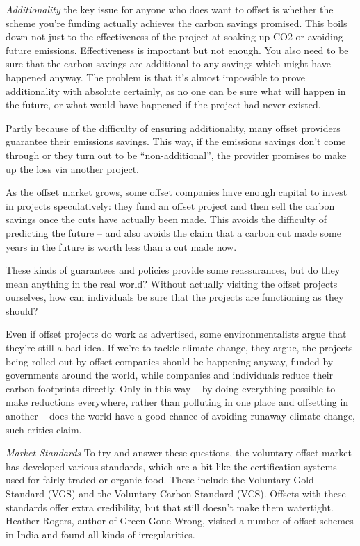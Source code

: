 \documentclass[
]{book}
\begin{document}
\emph{Additionality}
the key issue for anyone who does want to offset is whether the scheme you're funding actually achieves the carbon savings promised. This boils down not just to the effectiveness of the project at soaking up CO2 or avoiding future emissions. Effectiveness is important but not enough. You also need to be sure that the carbon savings are additional to any savings which might have happened anyway.
The problem is that it's almost impossible to prove additionality with absolute certainly, as no one can be sure what will happen in the future, or what would have happened if the project had never existed.

Partly because of the difficulty of ensuring additionality, many offset providers guarantee their emissions savings. This way, if the emissions savings don't come through or they turn out to be ``non-additional'', the provider promises to make up the loss via another project.

As the offset market grows, some offset companies have enough capital to invest in projects speculatively: they fund an offset project and then sell the carbon savings once the cuts have actually been made. This avoids the difficulty of predicting the future -- and also avoids the claim that a carbon cut made some years in the future is worth less than a cut made now.

These kinds of guarantees and policies provide some reassurances, but do they mean anything in the real world? Without actually visiting the offset projects ourselves, how can individuals be sure that the projects are functioning as they should?

Even if offset projects do work as advertised, some environmentalists argue that they're still a bad idea. If we're to tackle climate change, they argue, the projects being rolled out by offset companies should be happening anyway, funded by governments around the world, while companies and individuals reduce their carbon footprints directly. Only in this way -- by doing everything possible to make reductions everywhere, rather than polluting in one place and offsetting in another -- does the world have a good chance of avoiding runaway climate change, such critics claim.

\emph{Market Standards}
To try and answer these questions, the voluntary offset market has developed various standards, which are a bit like the certification systems used for fairly traded or organic food. These include the Voluntary Gold Standard (VGS) and the Voluntary Carbon Standard (VCS).
Offsets with these standards offer extra credibility, but that still doesn't make them watertight. Heather Rogers, author of Green Gone Wrong, visited a number of offset schemes in India and found all kinds of irregularities.
\end{document}
